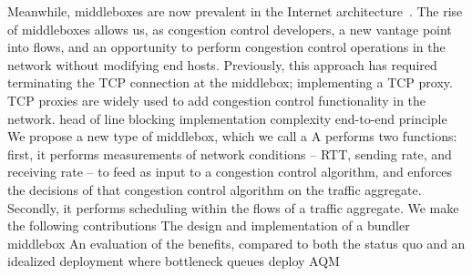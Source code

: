 \begin{outline}
\1 Meanwhile, middleboxes are now prevalent in the Internet architecture~\cite{aplomb}.
\1 The rise of middleboxes allows us, as congestion control developers, a new vantage point into flows, and an opportunity to perform congestion control operations in the network without modifying end hosts.
\1 Previously, this approach has required terminating the TCP connection at the middlebox; \ie implementing a TCP proxy.
    \2 TCP proxies are widely used to add congestion control functionality in the network.
    \2 
        \3 head of line blocking
        \3 implementation complexity
        \3 end-to-end principle
\1 We propose a new type of middlebox, which we call a \name
\1 A \name performs two functions: first, it performs measurements of network conditions -- RTT, sending rate, and receiving rate -- to feed as input to a congestion control algorithm, and enforces the decisions of that congestion control algorithm on the traffic aggregate.
    \2 Secondly, it performs scheduling within the flows of a traffic aggregate.
\1 We make the following contributions
    \2 The design and implementation of a bundler middlebox
    \2 An evaluation of the benefits, compared to both the status quo and an idealized deployment where bottleneck queues deploy AQM
\end{outline}
